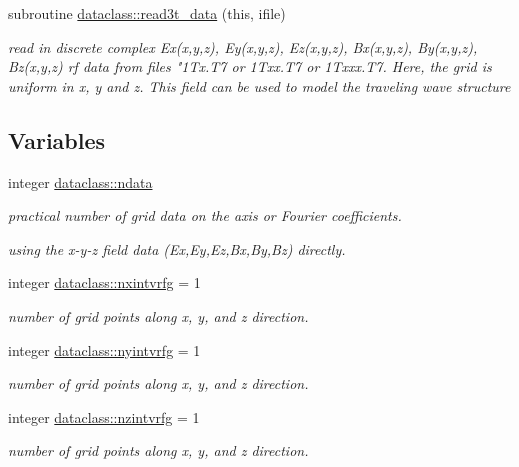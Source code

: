 \begin{DoxyCompactItemize}
subroutine \mbox{\hyperlink{namespacedataclass_a44430d1d47a985d35f3544c9b7dac562}{dataclass\+::read3t\+\_\+data}} (this, ifile)
\begin{DoxyCompactList}\small\item\em read in discrete complex Ex(x,y,z), Ey(x,y,z), Ez(x,y,z), Bx(x,y,z), By(x,y,z), Bz(x,y,z) rf data from files "1\+Tx.\+T7 or 1\+Txx.\+T7 or 1\+Txxx.\+T7. Here, the grid is uniform in x, y and z. This field can be used to model the traveling wave structure \end{DoxyCompactList}\end{DoxyCompactItemize}
\subsection*{Variables}
\begin{DoxyCompactItemize}
\item 
integer \mbox{\hyperlink{namespacedataclass_a72f075bdeedd35dc0962289e6f3461ba}{dataclass\+::ndata}}
\begin{DoxyCompactList}\small\item\em practical number of grid data on the axis or Fourier coefficients. \end{DoxyCompactList}\end{DoxyCompactItemize}
\textbf{ }\par
{\em using the x-\/y-\/z field data (Ex,Ey,Ez,Bx,By,Bz) directly. }\begin{DoxyCompactItemize}
\item 
integer \mbox{\hyperlink{namespacedataclass_a6302bc97206196f7003db67abd75507e}{dataclass\+::nxintvrfg}} = 1
\begin{DoxyCompactList}\small\item\em number of grid points along x, y, and z direction. \end{DoxyCompactList}\item 
integer \mbox{\hyperlink{namespacedataclass_a32c01f4c7d58343edc8d318b2e5f4760}{dataclass\+::nyintvrfg}} = 1
\begin{DoxyCompactList}\small\item\em number of grid points along x, y, and z direction. \end{DoxyCompactList}\item 
integer \mbox{\hyperlink{namespacedataclass_a53f757bd562f34f7e8e6bb58606fc289}{dataclass\+::nzintvrfg}} = 1
\begin{DoxyCompactList}\small\item\em number of grid points along x, y, and z direction. \end{DoxyCompactList}\end{DoxyCompactItemize}

